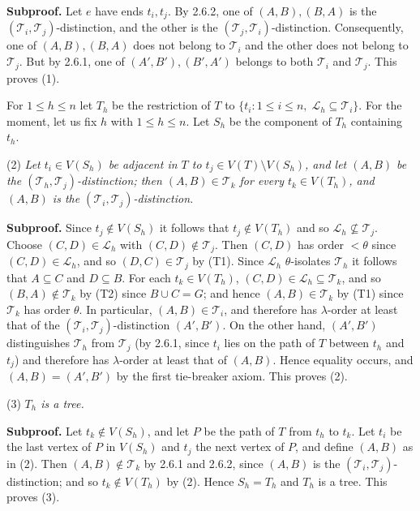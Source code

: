 \textbf{Subproof.} Let $e$ have ends $t_i, t_j$. By 2.6.2, one of $(A, B), (B, A)$ is the $(\mathscr{T}_i, \mathscr{T}_j)$-distinction, and the other is the $(\mathscr{T}_j, \mathscr{T}_i)$-distinction. Consequently, one of $(A, B), (B, A)$ does not belong to $\mathscr{T}_i$ and the other does not belong to $\mathscr{T}_j$. But by 2.6.1, one of $(A', B'), (B', A')$ belongs to both $\mathscr{T}_i$ and $\mathscr{T}_j$. This proves (1).

For $1 \le h \le n$ let $T_h$ be the restriction of $T$ to $\{t_i \colon 1 \le i \le n,\; \mathscr{L}_h \subseteq \mathscr{T}_i\}$. For the moment, let us fix $h$ with $1 \le h \le n$. Let $S_h$ be the component of $T_h$ containing $t_h$.

\hspace*{12pt}(2) \textit{Let $t_i \in V(S_h)$ be adjacent in $T$ to $t_j \in V(T) \setminus V(S_h)$, and let $(A, B)$ be the $(\mathscr{T}_h, \mathscr{T}_j)$-distinction; then $(A, B) \in \mathscr{T}_k$ for every $t_k \in V(T_h)$, and $(A, B)$ is the $(\mathscr{T}_i, \mathscr{T}_j)$-distinction.}

\textbf{Subproof.} Since $t_j \notin V(S_h)$ it follows that $t_j \notin V(T_h)$ and so $\mathscr{L}_h \nsubseteq \mathscr{T}_j$. Choose $(C, D) \in \mathscr{L}_h$ with $(C, D) \notin \mathscr{T}_j$. Then $(C, D)$ has order $<\theta$ since $(C, D) \in \mathscr{L}_h$, and so $(D, C) \in \mathscr{T}_j$ by (T1). Since $\mathscr{L}_h$ $\theta$-isolates $\mathscr{T}_h$ it follows that $A \subseteq C$ and $D \subseteq B$. For each $t_k \in V(T_h)$, $(C, D) \in \mathscr{L}_h \subseteq \mathscr{T}_k$, and so $(B, A) \notin \mathscr{T}_k$ by (T2) since $B \cup C = G$; and hence $(A, B) \in \mathscr{T}_k$ by (T1) since $\mathscr{T}_k$ has order $\theta$. In particular, $(A, B) \in \mathscr{T}_i$, and therefore has $\lambda$-order at least that of the $(\mathscr{T}_i, \mathscr{T}_j)$-distinction $(A', B')$. On the other hand, $(A', B')$ distinguishes $\mathscr{T}_h$ from $\mathscr{T}_j$ (by 2.6.1, since $t_i$ lies on the path of $T$ between $t_h$ and $t_j$) and therefore has $\lambda$-order at least that of $(A, B)$. Hence equality occurs, and $(A, B) = (A', B')$ by the first tie-breaker axiom. This proves (2).

\hspace*{12pt}(3) \textit{$T_h$ is a tree.}

\textbf{Subproof.} Let $t_k \notin V(S_h)$, and let $P$ be the path of $T$ from $t_h$ to $t_k$. Let $t_i$ be the last vertex of $P$ in $V(S_h)$ and $t_j$ the next vertex of $P$, and define $(A, B)$ as in (2). Then $(A, B) \notin \mathscr{T}_k$ by 2.6.1 and 2.6.2, since $(A, B)$ is the $(\mathscr{T}_i, \mathscr{T}_j)$-distinction; and so $t_k \notin V(T_h)$ by (2). Hence $S_h = T_h$ and $T_h$ is a tree. This proves (3).

